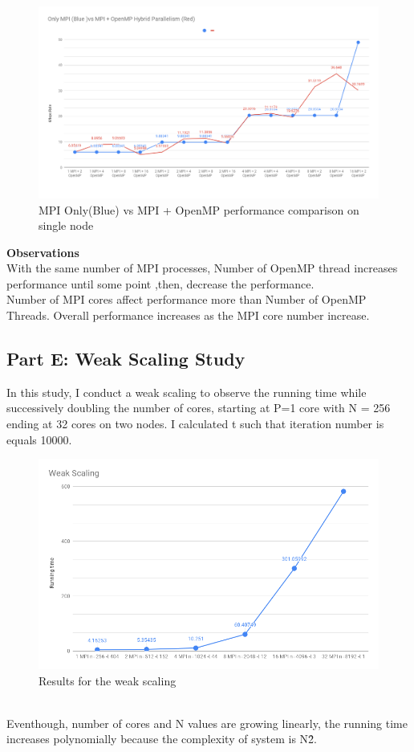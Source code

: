\documentclass{article}
\newcommand\tab[1][0.5cm]{\hspace*{#1}}
\begin{document}
\begin{figure}[!htb]
    \centering
    \includegraphics[width=1\linewidth]{./img/mpivsopenmp.png}
    \caption{MPI Only(Blue) vs MPI + OpenMP performance comparison on single node}
\end{figure} 

\textbf{Observations}
 \\ \tab With the same number of MPI processes, Number of OpenMP thread increases performance until some point ,then, decrease the performance. 
 \\ \tab Number of MPI cores affect performance more than Number of OpenMP Threads. Overall performance increases as the MPI core number increase.

\newpage

\subsection{Part E: Weak Scaling Study}
In this study, I conduct a weak scaling to observe the running time while successively doubling the number of cores, starting at P=1 core with N = 256 ending at 32 cores on two nodes. I calculated t such that iteration number is equals 10000.
\begin{figure}[!htb]
    \centering
    \includegraphics[width=1\linewidth]{./img/Weak-Scaling.png}
    \caption{Results for the weak scaling}
\end{figure}
\\ \tab Eventhough, number of cores and N values are growing linearly, the running time increases polynomially because the complexity of system is N\^2.  
\end{document}
